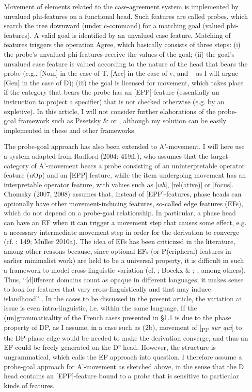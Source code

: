 \documentclass[output=paper]{langsci/langscibook}
\begin{document}
  Movement of elements related to the case-agreement system is implemented by unvalued phi-features on a functional head. Such features are called probes, which search the tree downward (under c-command) for a matching goal (valued phi-features). A valid goal is identified by an unvalued case feature. Matching of features triggers the operation Agree, which basically consists of three steps: (i) the probe’s unvalued phi-features receive the values of the goal; (ii) the goal’s unvalued case feature is valued according to the nature of the head that bears the probe (e.g., [Nom] in the case of T, [Acc] in the case of v, and – as I will argue – [Gen] in the case of D); (iii) the goal is licensed for movement, which takes place if the category that bears the probe has an [EPP]-feature (essentially an instruction to project a specifier) that is not checked otherwise (e.g. by an expletive). In this article, I will not consider further elaborations of the probe-goal framework such as Pesetsky \& \citet{Torrego2007} or \citet{Zeijlstra2010}, although my solution can be easily implemented in these and other frameworks.

  The probe-goal approach has also been extended to A’-movement. I will here use a system adapted from Radford (2004: 419ff.), who assumes that the target category of A’-movement bears a probe consisting of an uninterpretable operator feature (uOp) and an [EPP] feature, while the item undergoing movement has an interpretable operator feature, with values such as [\textit{wh}], [rel(ative)] or [focus]. Chomsky (2007, 2008) assumes that, instead of [EPP]-features, phase heads can optionally have other movement-inducing features, so-called edge features (EFs), which do not depend on a probe-goal relationship. In particular, a phase head can have an EF when it can trigger a movement step that causes some effect, e.g. a necessary intermediate movement step in order for the derivation to converge (cf. \citealt{Chomsky2008}: 149; Müller 2010a). The idea of EFs has been criticized in the literature, among other reasons because, since optional EFs (or P(eripheral)-features in earlier minimalist work) are held to be a universal property, it is difficult in such a framework to model cross-linguistic variation (cf. \citealt{Ceplova2001}; Boeckx \& \citealt{Grohmann2007}; \citealt{Boeckx2011}, among others). Thus, “[d]ifferent domains count as opaque in different languages; it makes sense to look for features that vary cross-linguistically and that may induce islandhood” \citep[4]{Boeckx2011}. In the cases to be discussed in the present article, the variation at issue is even intra-linguistic, i.e. within the same language. If the (un)grammaticality of the French cases presented in §1.1 is due to the phase property of DP, as I assume, in a case such as (2b), movement of [\textsubscript{PP} \textit{sur qui}] to the DP-phase edge would be needed to make the derivation converge, and thus an EF could be freely generated on the D° head. However, the structure is ungrammatical, which calls the EF approach into question. I therefore assume a probe-goal approach for A’-movement as sketched above, in the sense that the D head contains an [EPP]-feature bound to a probe that is sensitive to particular kinds of features.
\end{document}
